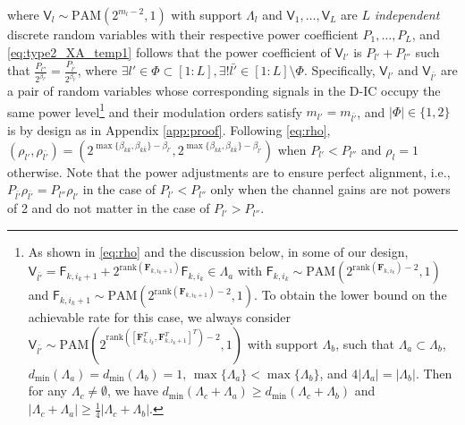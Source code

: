 \documentclass[12pt, draftclsnofoot, onecolumn]{IEEEtran}
\newcommand{\msf}[1]{\mathsf{#1}}
\theoremstyle{definition}
\begin{document}
where $\msf{V}_l\sim\text{PAM}(2^{m_l-2},1)$ with support $\Lambda_l$ and $\msf{V}_1,\ldots,\msf{V}_L$ are $L$ \emph{independent} discrete random variables with their respective power coefficient $P_1,\ldots,P_L$, and \eqref{eq:type2_XA_temp1} follows that the power coefficient of $\msf{V}_{l'}$ is $P_{l'}+P_{l''}$ such that $\frac{P_{l''}}{2^{\beta_{l'}}}=\frac{P_{\bar{l'}}}{2^{\beta_{\bar{l'}}}}$, where $\exists l' \in \Phi \subset [1:L],\exists! \bar{l'} \in [1:L] \setminus \Phi$. Specifically, $\msf{V}_{l'}$ and $\msf{V}_{\bar{l'}}$ are a pair of random variables whose corresponding signals in the D-IC occupy the same power level\footnote{\label{footnote1}%
As shown in \eqref{eq:rho} and the discussion below, in some of our design, $\msf{V}_{\bar{l'}} = \msf{F}_{k,i_k+1}+ 2^{\text{rank}(\boldsymbol{F}_{k,i_k+1})}\msf{F}_{k,i_k} \in \Lambda_a$ with $\msf{F}_{k,i_k} \sim \text{PAM}(2^{\text{rank}(\boldsymbol{F}_{k,i_k})-2},1)$ and $\msf{F}_{k,i_k+1} \sim \text{PAM}(2^{\text{rank}(\boldsymbol{F}_{k,i_k+1})-2},1)$. To obtain the lower bound on the achievable rate for this case, we always consider $\msf{V}_{\bar{l'}} \sim \text{PAM}(2^{\text{rank}([\boldsymbol{F}_{k,i_k}^T,\boldsymbol{F}_{k,i_k+1}^T]^T)-2},1)$ with support $ \Lambda_b$, such that $\Lambda_a \subset \Lambda_b$, $d_{\min}(\Lambda_a) = d_{\min}(\Lambda_b)=1$, $\max\{\Lambda_a\} < \max\{\Lambda_b\}$, and $4|\Lambda_a| = |\Lambda_b|$. Then for any $\Lambda_c \neq \emptyset$, we have $d_{\min}(\Lambda_c+\Lambda_a)\geq d_{\min}(\Lambda_c+\Lambda_b)$ and $|\Lambda_c+\Lambda_a| \geq \frac{1}{4}|\Lambda_c+\Lambda_b|$.} and their modulation orders satisfy $m_{l'}=m_{\bar{l'}}$, and $|\Phi|\in \{1,2\}$ is by design as in Appendix \ref{app:proof}. Following \eqref{eq:rho}, $(\rho_{l'},\rho_{\bar{l'}}) = (2^{\max\{\beta_{kk},\beta_{k\bar{k}}\}-\beta_{l'}},2^{\max\{\beta_{kk},\beta_{k\bar{k}}\}-\beta_{\bar{l'}}})$ when $P_{l'}<P_{l''}$ and $\rho_l = 1$ otherwise. Note that the power adjustments are to ensure perfect alignment, i.e., $P_{\bar{l'}}\rho_{\bar{l'}} = P_{l''}\rho_{l'}$ in the case of $P_{l'}<P_{l''}$ only when the channel gains are not powers of 2 and do not matter in the case of $P_{l'}>P_{l''}$.
\end{document}

